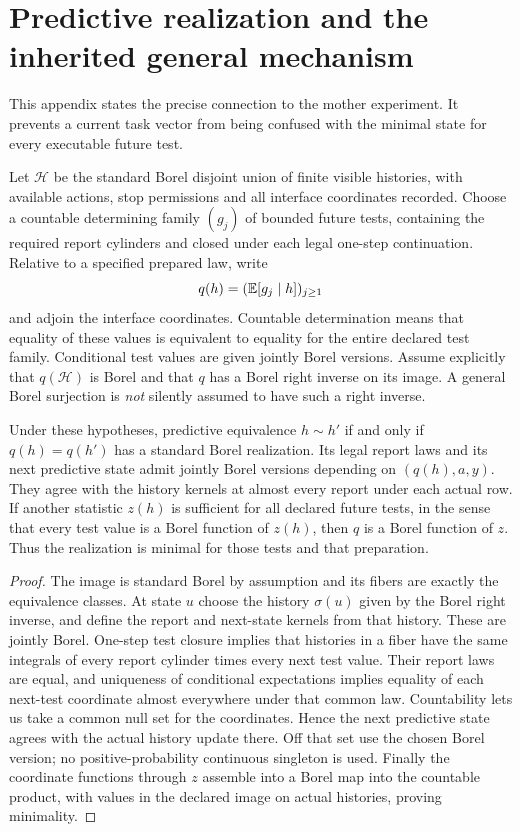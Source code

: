 \section{Predictive realization and the inherited general mechanism}\label{app:predictive}
This appendix states the precise connection to the mother experiment. It prevents a current task vector from being confused with the minimal state for every executable future test.

Let $\mathcal H$ be the standard Borel disjoint union of finite visible histories, with available actions, stop permissions and all interface coordinates recorded. Choose a countable determining family $(g_j)$ of bounded future tests, containing the required report cylinders and closed under each legal one-step continuation. Relative to a specified prepared law, write
\[
 q(h)=(\mathbb E[g_j\mid h])_{j\ge1}
\]
and adjoin the interface coordinates. Countable determination means that equality of these values is equivalent to equality for the entire declared test family. Conditional test values are given jointly Borel versions. Assume explicitly that $q(\mathcal H)$ is Borel and that $q$ has a Borel right inverse on its image. A general Borel surjection is \emph{not} silently assumed to have such a right inverse.

\begin{proposition}\label{prop:quotient}
Under these hypotheses, predictive equivalence $h\sim h'$ if and only if $q(h)=q(h')$ has a standard Borel realization. Its legal report laws and its next predictive state admit jointly Borel versions depending on $(q(h),a,y)$. They agree with the history kernels at almost every report under each actual row. If another statistic $z(h)$ is sufficient for all declared future tests, in the sense that every test value is a Borel function of $z(h)$, then $q$ is a Borel function of $z$. Thus the realization is minimal for those tests and that preparation.
\end{proposition}
\begin{proof}
The image is standard Borel by assumption and its fibers are exactly the equivalence classes. At state $u$ choose the history $\sigma(u)$ given by the Borel right inverse, and define the report and next-state kernels from that history. These are jointly Borel. One-step test closure implies that histories in a fiber have the same integrals of every report cylinder times every next test value. Their report laws are equal, and uniqueness of conditional expectations implies equality of each next-test coordinate almost everywhere under that common law. Countability lets us take a common null set for the coordinates. Hence the next predictive state agrees with the actual history update there. Off that set use the chosen Borel version; no positive-probability continuous singleton is used. Finally the coordinate functions through $z$ assemble into a Borel map into the countable product, with values in the declared image on actual histories, proving minimality.
\end{proof}

